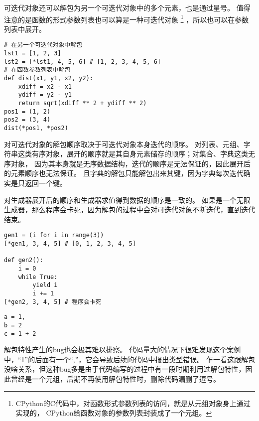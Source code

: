 \documentclass{ctexbook}
\begin{document}
可迭代对象还可以解包为另一个可迭代对象中的多个元素，也是通过星号。
值得注意的是函数的形式参数列表也可以算是一种可迭代对象
\footnote{CPython的C代码中，对函数形式参数列表的访问，就是从元组对象身上通过实现的，
CPython给函数对象的参数列表封装成了一个元组。}
，所以也可以在参数列表中展开。

\begin{verbatim}
# 在另一个可迭代对象中解包
lst1 = [1, 2, 3]
lst2 = [*lst1, 4, 5, 6] # [1, 2, 3, 4, 5, 6]
# 在函数参数列表中解包
def dist(x1, y1, x2, y2):
    xdiff = x2 - x1
    ydiff = y2 - y1
    return sqrt(xdiff ** 2 + ydiff ** 2)
pos1 = (1, 2)
pos2 = (3, 4)
dist(*pos1, *pos2)
\end{verbatim}

对可迭代对象的解包顺序取决于可迭代对象本身迭代的顺序。
对列表、元组、字符串这类有序对象，展开的顺序就是其自身元素储存的顺序；对集合、字典这类无序对象，
因为其本身就是无序数据结构，迭代的顺序是无法保证的，因此展开后的元素顺序也无法保证。
且字典的解包只能解包出来其键，因为字典每次迭代确实是只返回一个键。

对生成器展开后的顺序和生成器求值得到数据的顺序是一致的。
如果是一个无限生成器，那么程序会卡死，因为解包的过程中会对可迭代对象不断迭代，直到迭代结束。


\begin{verbatim}
gen1 = (i for i in range(3))
[*gen1, 3, 4, 5] # [0, 1, 2, 3, 4, 5]

def gen2():
    i = 0
    while True:
        yield i
        i += 1
[*gen2, 3, 4, 5] # 程序会卡死
\end{verbatim}

\begin{multicols}{2}

\begin{verbatim}
a = 1,
b = 2
c = 1 + 2
\end{verbatim}

解包特性产生的bug也会极其难以排察。
代码量大的情况下很难发现这个案例中，``1''的后面有一个``,''，它会导致后续的代码中报出类型错误。
乍一看这跟解包没啥关系，但这种bug多是由于代码编写的过程中有一段时期利用过解包特性，因此曾经是一个元组，后期不再使用解包特性时，删除代码漏删了逗号。

\end{multicols}
\end{document}
